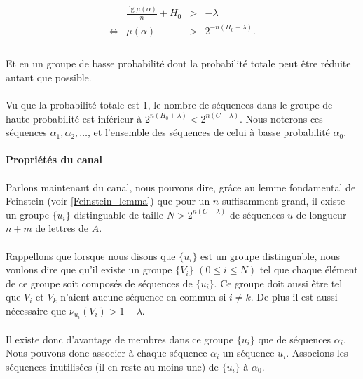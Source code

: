 	\[
		\begin{array}{crcl}
			&\frac{\lg \mu\left(\alpha\right)}{n}+H_0 &>& -\lambda\\
			\Leftrightarrow & \mu(\alpha) & > &2^{-n\left(H_0+\lambda\right)}.\\
		\end{array}
	\]
	
	\paragraph{}
	Et en un groupe de basse probabilité dont la probabilité totale peut être réduite autant que possible.

	\paragraph{}
	Vu que la probabilité totale est 1, le nombre de séquences dans le groupe de haute probabilité est inférieur à $2^{n(H_0+\lambda)}<2^{n(C-\lambda)}$.
	Nous noterons ces séquences $\alpha_1,\alpha_2,\dots$, et l'ensemble des séquences de celui à basse probabilité $\alpha_0$.
	
\paragraph{Propriétés du canal}
	
	\paragraph{}
	Parlons maintenant du canal, nous pouvons dire, grâce au lemme fondamental de Feinstein (voir \ref{Feinstein_lemma}) 
	que pour un $n$ suffisamment grand, il existe un groupe $\{u_i\}$ distinguable de taille $N > 2^{n(C-\lambda)}$ de séquences $u$ de longueur $n+m$ de lettres 
	de $A$.
	
	\paragraph{}
	Rappellons que lorsque nous disons que $\{u_i\}$ est un groupe distinguable, nous voulons dire que qu'il existe un groupe $\{V_i\}$ $(0 \le i \le N)$ 
	tel que chaque élément de ce groupe soit composés de séquences de $\{u_i\}$. Ce groupe doit aussi être tel que $ V_i$ et $V_k$ n'aient aucune séquence
	en commun si $i\neq k$. De plus il est aussi nécessaire que $\nu_{u_i}(V_i) > 1-\lambda$. 
	
	\paragraph{}
	Il existe donc d'avantage de membres dans ce groupe $\{u_i\}$ que de séquences $\alpha_i$. Nous pouvons donc associer à chaque séquence $\alpha_i$
	un séquence $u_i$. Associons les séquences inutilisées (il en reste au moins une) de $\{u_i\}$ à $\alpha_0$.
	
